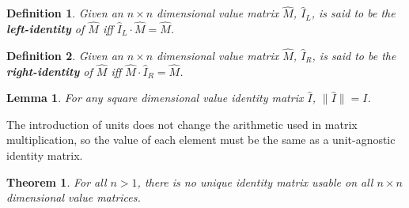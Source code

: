 \documentclass[10pt,letterpaper]{article}
\newtheorem{defn}{Definition}[section]
\newtheorem{lem}{Lemma}[section]
\newtheorem{thm}{Theorem}[section]
\numberwithin{equation}{section}
\begin{document}
\begin{defn}Given an $n \times n$ dimensional value matrix $\hat M$,
  $\hat I_L$, is said to be the \textbf{left-identity} of $\hat M$ iff
  $\hat I_L \cdot \hat M = \hat M$.\end{defn}

\begin{defn}Given an $n \times n$ dimensional value matrix $\hat M$,
  $\hat I_R$, is said to be the \textbf{right-identity} of $\hat M$
  iff $\hat M \cdot \hat I_R = \hat M$.\end{defn}

\begin{lem} \label{dimensional_identities_all_have_the_values_of_I}
  For any square dimensional value identity matrix $\hat I$, $\| \hat
  I \| = I$.\end{lem}

The introduction of units does not change the arithmetic used in
matrix multiplication, so the value of each element must be the same
as a unit-agnostic identity matrix.

\begin{thm}For all $n > 1$, there is no unique identity matrix usable
  on all $n \times n$ dimensional value matrices.\end{thm}
\end{document}
